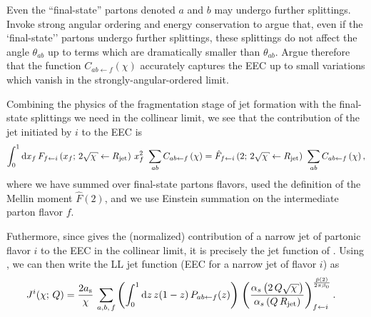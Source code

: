 
\begin{exercise}
   Even the ``final-state'' partons denoted \(a\) and \(b\) may undergo further splittings.
   Invoke strong angular ordering and energy conservation to argue that, even if the `final-state'' partons undergo further splittings, these splittings do not affect the angle \(\theta_{ab}\) up to terms which are dramatically smaller than \(\theta_{ab}\).
   Argue therefore that the function \(C_{ab\leftarrow f}(\chi)\) accurately captures the EEC up to small variations which vanish in the strongly-angular-ordered limit.
\end{exercise}



Combining the physics of the fragmentation stage of jet formation with the final-state splittings we need in the collinear limit, we see that the contribution of the jet initiated by \(i\) to the EEC is
\begin{align}
    \label{eq:jet_fn_ll_0}
    \int_0^1
    \dd x_f
    \,
    F_{f \leftarrow i}\le(x_f;\,
    2 \sqrt{\chi}\leftarrow \Rjet\ri)
    \,
    x_f^2
    \,\,
    \sum_{ab} C_{ab\leftarrow f}\le(\chi\ri)
    =
    \hat{F}_{f \leftarrow i}
    \le(2;\,
    2 \sqrt{\chi}\leftarrow \Rjet\ri)
    \,\,
    \sum_{ab} C_{ab\leftarrow f}\le(\chi\ri)
    ,
\end{align}
%
where we have summed over final-state partons flavors, used the definition of the Mellin moment \(\hat{F}(2)\), and we use Einstein summation on the intermediate parton flavor \(f\).

Futhermore, since  gives the (normalized) contribution of a narrow jet of partonic flavor \(i\) to the EEC in the collinear limit, it is precisely the jet function of .
%
Using , we can then write the LL jet function (EEC for a narrow jet of flavor \(i\)) as
\begin{align}
    \label{eq:eec_jet_fn_ll_1}
    J^i(\chi; \, Q)
    &=
    \frac{2 \as}{\chi}
    \,
    \sum_{a,b,\,f}
    \le(
        \int_0^1 \dd z \, z (1-z) \,
        P_{ab \leftarrow f}(z)
    \ri)
    \,
    \le(
        \frac{\alpha_s\le(2\,Q\sqrt{\chi}\ri)}
        {\alpha_s\le(Q\,\Rjet\ri)}
    \ri)
    ^
    {\frac{\hat{p}(2)}{2\pi\beta_0}}
    _{f\leftarrow i}
    .
\end{align}




